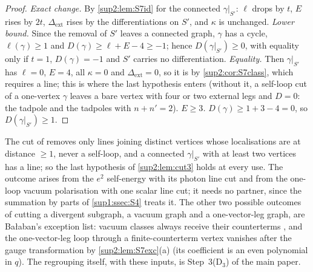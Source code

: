 \begin{proof}
\emph{Exact change.} By \cref{sup2:lem:S7id} for the connected $\gamma|_{S'}$: $\ell$ drops by $t$, $E$ rises by $2t$, $\Delta_{\mathrm{ext}}$ rises by the differentiations on $S'$, and $\kappa$ is unchanged. \emph{Lower bound.} Since the removal of $S'$ leaves a connected graph, $\gamma$ has a cycle, $\ell(\gamma)\ge1$ and $D(\gamma)\ge\ell+E-4\ge-1$; hence $D(\gamma|_{S'})\ge0$, with equality only if $t=1$, $D(\gamma)=-1$ and $S'$ carries no differentiation. \emph{Equality.} Then $\gamma|_{S'}$ has $\ell=0$, $E=4$, all $\kappa=0$ and $\Delta_{\mathrm{ext}}=0$, so it is \cite[(2.4)]{Ba3} by \cref{sup2:cor:S7class}, which requires a line; this is where the last hypothesis enters (without it, a self-loop cut of a one-vertex $\gamma$ leaves a bare vertex with four or two external legs and $D=0$: the \cite[(1.6)]{Ba3} tadpole and the \cite[(1.10)]{Ba3} tadpoles with $n+n'=2$). \emph{$E\ge3$.} $D(\gamma)\ge1+3-4=0$, so $D(\gamma|_{S'})\ge1$.
\end{proof}

The cut of \cite[p.~432]{Ba3} removes only lines joining distinct vertices whose localisations are at distance $\ge1$, never a self-loop, and a connected $\gamma|_{S'}$ with at least two vertices has a line; so the last hypothesis of \cref{sup2:lem:cut3} holds at every use. The outcome \cite[(2.4)]{Ba3} arises from the $e^2$ self-energy with its photon line cut and from the one-loop vacuum polarisation with one scalar line cut; it needs no partner, since the summation by parts of \cref{sup1:ssec:S4} treats it. The other two possible outcomes of cutting a divergent subgraph, a vacuum graph and a one-vector-leg graph, are Ba{\l}aban's exception list: vacuum classes always receive their counterterms \cite[p.~432]{Ba3}, and the one-vector-leg loop through a finite-counterterm vertex vanishes after the gauge transformation by \cref{sup2:lem:S7exc}(a) (its coefficient is an even polynomial in $q$). The regrouping itself, with these inputs, is Step~3(D$_3$) of the main paper.
